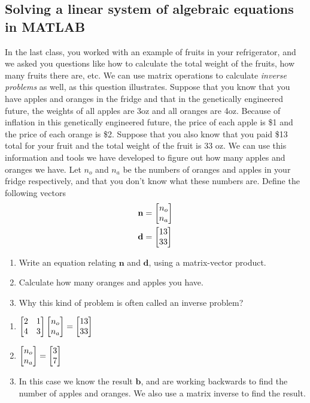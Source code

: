 \subsection{Solving a linear system of algebraic equations in MATLAB}

\begin{prob}
In the last class, you worked with an example of fruits in your refrigerator, and we asked you questions like how to calculate the total weight of the fruits, how many fruits there are, etc. We can use matrix operations to calculate \emph{inverse problems} as well, as this question illustrates. Suppose that you know that you have apples and oranges in the fridge and that in the genetically engineered future, the weights of all apples are 3oz and all oranges are 4oz. Because of inflation in this genetically engineered future, the price of each apple is \$1 and the price of each orange is \$2. Suppose that you also know that you paid \$13 total for your fruit and the total weight of the fruit is 33 oz. We can use this information and tools we have developed to figure out how many apples and oranges we have.  Let $n_o$ and $n_a$ be the numbers of oranges and apples in your fridge respectively, and that you don't know what these numbers are. Define the following vectors
    \begin{align}
    \mathbf{n} &= \begin{bmatrix} n_o \\ n_a \end{bmatrix}\\
    \mathbf{d} &= \begin{bmatrix} 13 \\ 33 \end{bmatrix}
    \end{align}
\begin{enumerate}
\item Write an equation relating $\mathbf{n}$ and $\mathbf{d}$, using a matrix-vector product.
\item Calculate how many oranges and apples you have.
\item Why this kind of problem is often called an inverse problem?
\end{enumerate}
\end{prob}
\begin{sol}
    \begin{enumerate}
        \item $\begin{bmatrix} 2 & 1 \\ 4 & 3\end{bmatrix}\begin{bmatrix} n_{o} \\ n_{a} \end{bmatrix}=\begin{bmatrix} 13 \\ 33 \end{bmatrix}$
        \item $\begin{bmatrix} n_{o} \\ n_{a} \end{bmatrix}=\begin{bmatrix} 3 \\ 7 \end{bmatrix}$
        \item In this case we know the result $\mathbf{b}$, and are working backwards to find the number of apples and oranges. We also use a matrix inverse to find the result.
    \end{enumerate}
\end{sol}

